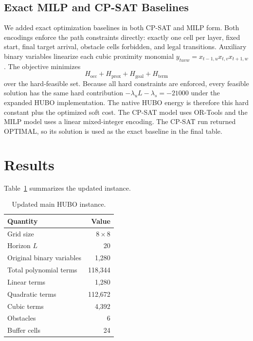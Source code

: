 \documentclass[10pt,conference]{IEEEtran}
\begin{document}
\subsection{Exact MILP and CP-SAT Baselines}
We added exact optimization baselines in both CP-SAT and MILP form. Both encodings enforce the path constraints directly: exactly one cell per layer, fixed start, final target arrival, obstacle cells forbidden, and legal transitions. Auxiliary binary variables linearize each cubic proximity monomial $y_{tuvw}=x_{t-1,u}x_{t,v}x_{t+1,w}$. The objective minimizes
\begin{equation}
H_{\mathrm{occ}}+H_{\mathrm{prox}}+H_{\mathrm{goal}}+H_{\mathrm{term}}
\end{equation}
over the hard-feasible set. Because all hard constraints are enforced, every feasible solution has the same hard contribution $-\lambda_u L-\lambda_s=-21000$ under the expanded HUBO implementation. The native HUBO energy is therefore this hard constant plus the optimized soft cost. The CP-SAT model uses OR-Tools and the MILP model uses a linear mixed-integer encoding. The CP-SAT run returned OPTIMAL, so its solution is used as the exact baseline in the final table.

\section{Results}
Table~\ref{tab:instance} summarizes the updated instance.
\begin{table}[t]
\caption{Updated main HUBO instance.}
\label{tab:instance}
\centering
\begin{tabular}{lr}
\toprule
Quantity & Value\\
\midrule
Grid size & $8\times 8$\\
Horizon $L$ & 20\\
Original binary variables & 1,280\\
Total polynomial terms & 118,344\\
Linear terms & 1,280\\
Quadratic terms & 112,672\\
Cubic terms & 4,392\\
Obstacles & 6\\
Buffer cells & 24\\
\bottomrule
\end{tabular}
\end{table}
\end{document}
